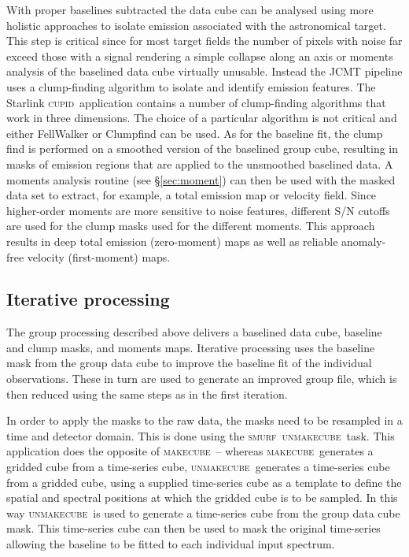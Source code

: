 \documentclass[useAMS,usenatbib]{mn2e}
\newcommand{\cupid}{\textsc{cupid}}
\newcommand{\smurf}{\textsc{smurf}}
\newcommand{\makecube}{\textsc{makecube}}
\newcommand{\unmakecube}{\textsc{unmakecube}}
\newcommand{\ascl}[1]{\href{http://www.ascl.net/#1}{ascl:#1}}
\begin{document}
With proper baselines subtracted the data cube can be analysed using more
holistic approaches to isolate emission associated with the astronomical
target. This step is critical since for most target fields the number of pixels with
noise far exceed those with a signal rendering a simple collapse along an axis
or moments analysis of the baselined data cube virtually unusable. Instead
the JCMT pipeline uses a clump-finding algorithm to isolate and identify
emission features.
The Starlink \cupid\ application contains
a number of clump-finding algorithms that work in three dimensions.
The choice of a particular algorithm is not critical and either FellWalker \citep{2015FW} or
Clumpfind \citep[][\ascl{1107.014}]{1994ApJ...428..693W} can be used.
As for the baseline fit, the clump find is performed on a smoothed version
of the baselined group cube, resulting in masks of emission regions that
are applied to the unsmoothed baselined data. A moments analysis routine
(see \mbox{\S \ref{sec:moment}}) can then be used with the masked data set to
extract, for example, a total emission map or velocity field. Since higher-order moments are
more sensitive to noise features, different S/N cutoffs are used for the
clump masks used for the different moments. This approach results in deep
total emission (zero-moment) maps as well as reliable anomaly-free
velocity (first-moment) maps.


\subsection{Iterative processing}

The group processing described above delivers a baselined data cube,
baseline and clump masks, and moments maps. Iterative processing uses
the baseline mask from the group data cube to improve the baseline fit
of the individual observations. These in turn are used to generate an improved
group file, which is then reduced using the same steps as in the first iteration.

In order to apply the masks to the raw data, the masks need to be resampled
in a time and detector domain. This is done using the \smurf\ \unmakecube\ task.
This application
does the opposite of \makecube\ -- whereas \makecube\
generates a gridded cube from a time-series cube, \unmakecube\ generates
a time-series cube from a gridded cube, using a supplied time-series cube
as a template to define the spatial and spectral positions at which the
gridded cube is to be sampled. In this way \unmakecube\ is used to generate
a time-series cube from the group data cube mask. This time-series cube can
then be used to mask the original time-series allowing the baseline to be
fitted to each individual input spectrum.
\end{document}
